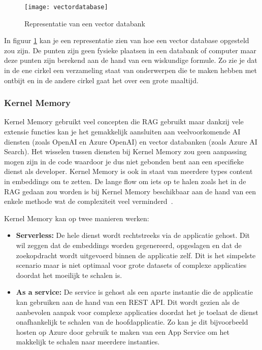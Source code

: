 \begin{figure}
    \centering
    \texttt{[image: vectordatabase]}
    \caption{Representatie van een vector databank}
    \label{fig:vectordatabase}
\end{figure}

In figuur \ref{fig:vectordatabase} kan je een representatie zien van hoe een vector database opgesteld zou zijn. De punten zijn geen fysieke plaatsen in een databank of computer maar deze punten zijn berekend aan de hand van een wiskundige formule. Zo zie je dat in de ene cirkel een verzameling staat van onderwerpen die te maken hebben met ontbijt en in de andere cirkel gaat het over een grote maaltijd. 

\subsubsection{Kernel Memory}
Kernel Memory gebruikt veel concepten die RAG gebruikt maar dankzij vele extensie functies kan je het gemakkelijk aansluiten aan veelvoorkomende AI diensten (zoals OpenAI en Azure OpenAI) en vector databanken (zoals Azure AI Search). Het wisselen tussen diensten bij Kernel Memory zou geen aanpassing mogen zijn in de code waardoor je dus niet gebonden bent aan een specifieke dienst als developer. Kernel Memory is ook in staat van meerdere types content in embeddings om te zetten. De lange flow om iets op te halen zoals het in de RAG gedaan zou worden is bij Kernel Memory beschikbaar aan de hand van een enkele methode wat de complexiteit veel verminderd~\autocite{Cantina2024}.

Kernel Memory kan op twee manieren werken:

\begin{itemize}
    \item \textbf{Serverless:} De hele dienst wordt rechtstreeks via de applicatie gehost. Dit wil zeggen dat de embeddings worden gegenereerd, opgeslagen en dat de zoekopdracht wordt uitgevoerd binnen de applicatie zelf. Dit is het simpelste scenario maar is niet optimaal voor grote datasets of complexe applicaties doordat het moeilijk te schalen is. 
    \item \textbf{As a service:} De service is gehost als een aparte instantie die de applicatie kan gebruiken aan de hand van een REST API. Dit wordt gezien als de aanbevolen aanpak voor complexe applicaties doordat het je toelaat de dienst onafhankelijk te schalen van de hoofdapplicatie. Zo kan je dit bijvoorbeeld hosten op Azure door gebruik te maken van een App Service om het makkelijk te schalen naar meerdere instanties.
\end{itemize}









